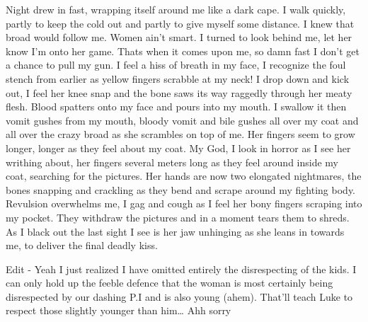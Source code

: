 Night drew in fast, wrapping itself around me like a dark cape. I
walk quickly, partly to keep the cold out and partly to give myself
some distance. I knew that broad would follow me. Women ain't
smart. I turned to look behind me, let her know I'm onto her game.
Thats when it comes upon me, so damn fast I don't get a chance to
pull my gun. I feel a hiss of breath in my face, I recognize the
foul stench from earlier as yellow fingers scrabble at my neck! I
drop down and kick out, I feel her knee snap and the bone saws its
way raggedly through her meaty flesh. Blood spatters onto my face
and pours into my mouth. I swallow it then vomit gushes from my
mouth, bloody vomit and bile gushes all over my coat and all over
the crazy broad as she scrambles on top of me. Her fingers seem to
grow longer, longer as they feel about my coat. My God, I look in
horror as I see her writhing about, her fingers several meters long
as they feel around inside my coat, searching for the pictures. Her
hands are now two elongated nightmares, the bones snapping and
crackling as they bend and scrape around my fighting body.
Revulsion overwhelms me, I gag and cough as I feel her bony fingers
scraping into my pocket. They withdraw the pictures and in a moment
tears them to shreds. As I black out the last sight I see is her
jaw unhinging as she leans in towards me, to deliver the final
deadly kiss.





Edit - Yeah I just realized I have omitted entirely the
disrespecting of the kids. I can only hold up the feeble defence
that the woman is most certainly being disrespected by our dashing
P.I and is also young (ahem). That'll teach Luke to respect those
slightly younger than him{\ldots} Ahh sorry  
 



